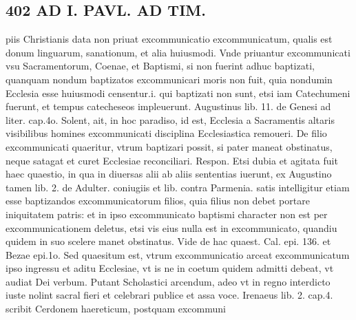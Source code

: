 \documentclass{article}
\begin{document}
\begin{pages}
\section*{402 AD I. PAVL. AD TIM. }\pstart piis Christianis data non priuat excommunicatio excommunicatum, qualis est donum linguarum, sanationum, et alia huiusmodi. Vnde priuantur excommunicati vsu Sacramentorum, Coenae, et Baptismi, si non fuerint adhuc baptizati, quanquam nondum baptizatos excommunicari moris non fuit, quia nondumin Ecclesia esse huiusmodi censentur.i. qui baptizati non sunt, etsi iam Catechumeni fuerunt, et tempus catecheseos impleuerunt. Augustinus lib.  11. de Genesi ad liter. cap.4o. Solent, ait, in hoc paradiso, id est, Ecclesia a Sacramentis altaris visibilibus homines excommunicati disciplina Ecclesiastica remoueri. De filio excommunicati quaeritur, vtrum baptizari possit, si pater maneat obstinatus, neque satagat et curet Ecclesiae reconciliari. Respon. Etsi dubia et agitata fuit haec quaestio, in qua in diuersas alii ab aliis sententias iuerunt, ex Augustino tamen lib. 2. de Adulter. coniugiis et lib. contra Parmenia. satis intelligitur etiam esse baptizandos excommunicatorum filios, quia filius non debet portare iniquitatem patris: et in ipso excommunicato baptismi character non est per excommunicationem deletus, etsi vis eius nulla est in excommunicato, quandiu quidem in suo scelere manet obstinatus. Vide de hac quaest. Cal. epi. 136. et Bezae epi.1o. Sed quaesitum est, vtrum excommunicatio arceat excommunicatum ipso ingressu et aditu Ecclesiae, vt is ne in coetum quidem admitti debeat, vt audiat Dei verbum. Putant Scholastici arcendum, adeo vt in regno interdicto iuste nolint sacral fieri et celebrari publice et assa voce. Irenaeus lib. 2. cap.4. scribit Cerdonem haereticum, postquam excommuni\pend

\end{pages}
\end{document}
